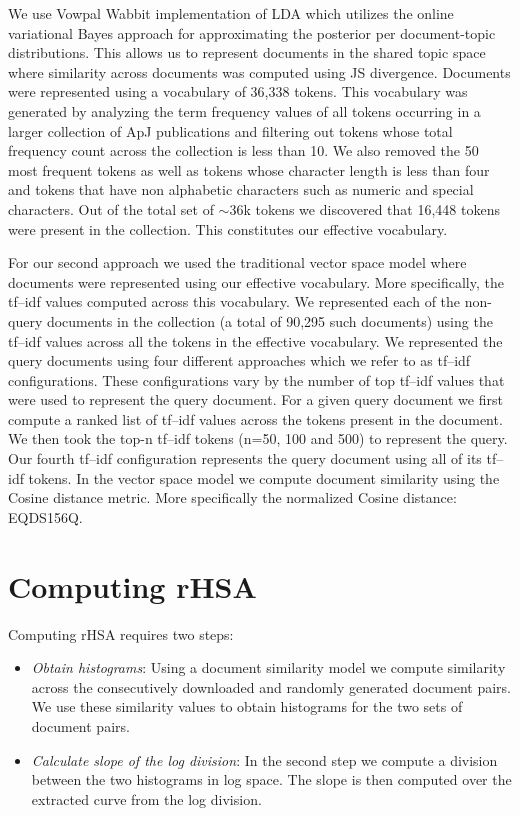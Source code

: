 \documentclass[letterpaper]{article}
\begin{document}
We use Vowpal Wabbit \cite{Langford} implementation of LDA which utilizes the online variational Bayes approach \cite{Hoffman} for approximating the posterior per document-topic distributions. This allows us to represent documents in the shared topic space where similarity across documents was computed using JS divergence. Documents were represented using a vocabulary of 36,338 tokens. This vocabulary was generated by analyzing the term frequency values of all tokens occurring in a larger collection of ApJ publications and filtering out tokens whose total frequency count across the collection is less than 10. We also removed the 50 most frequent tokens as well as tokens whose character length is less than four and tokens that have non alphabetic characters such as numeric and special characters. Out of the total set of $\sim$36k tokens we discovered that 16,448 tokens were present in the collection. This constitutes our effective vocabulary. 

For our second approach we used the traditional vector space model \cite{Croft_book} where documents were represented using our effective vocabulary. More specifically, the tf--idf values computed across this vocabulary. We represented each of the non-query documents in the collection (a total of 90,295 such documents) using the tf--idf values across all the tokens in the effective vocabulary. We represented the query documents using four different approaches which we refer to as tf--idf configurations. These configurations vary by the number of top tf--idf values that were used to represent the query document. For a given query document we first compute a ranked list of tf--idf values across the tokens present in the document. We then took the top-n tf--idf tokens (n=50, 100 and 500) to represent the query. Our fourth tf--idf configuration represents the query document using all of its tf--idf tokens. In the vector space model we compute document similarity using the Cosine distance metric. More specifically the normalized Cosine distance: EQDS156Q.

\section{Computing rHSA}

Computing rHSA requires two steps:
\begin{itemize}
\item \textit{Obtain histograms}: Using a document similarity model we compute similarity across the consecutively downloaded and randomly generated document pairs. We use these similarity values to obtain histograms for the two sets of document pairs. 
\item \textit{Calculate slope of the log division}: In the second step we compute a division between the two histograms in log space. The slope is then computed over the extracted curve from the log division.  
\end{itemize}
\end{document}

